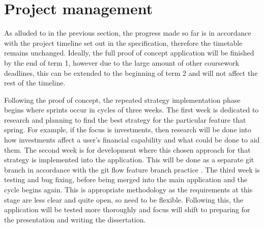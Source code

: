 \section{Project management}

As alluded to in the previous section, the progress made so far is in accordance with the project timeline set out in the specification, therefore the timetable remains unchanged. Ideally, the full proof of concept application will be finished by the end of term 1, however due to the large amount of other coursework deadlines, this can be extended to the beginning of term 2 and will not affect the rest of the timeline.

Following the proof of concept, the repeated strategy implementation phase begins where sprints occur in cycles of three weeks. The first week is dedicated to research and planning to find the best strategy for the particular feature that spring. For example, if the focus is investments, then research will be done into how investments affect a user's financial capability and what could be done to aid them. The second week is for development where this chosen approach for that strategy is implemented into the application. This will be done as a separate git branch in accordance with the git flow feature branch practice \cite{GitFlow}. The third week is testing and bug fixing, before being merged into the main application and the cycle begins again. This is appropriate methodology as the requirements at this stage are less clear and quite open, so need to be flexible. Following this, the application will be tested more thoroughly and focus will shift to preparing for the presentation and writing the dissertation.